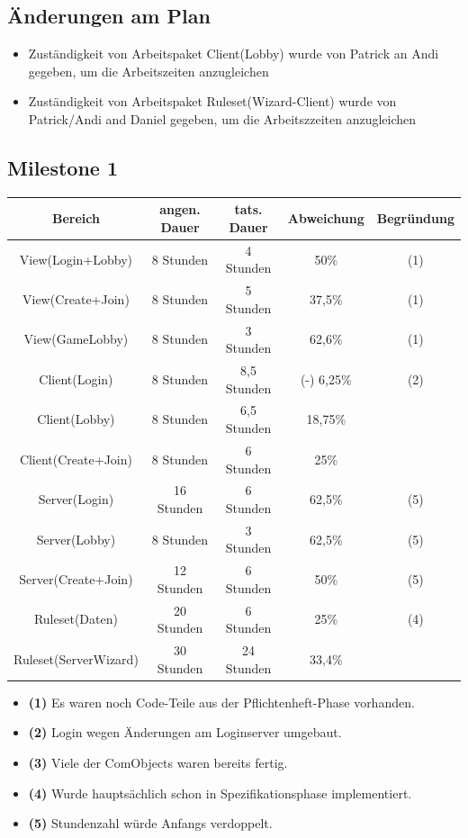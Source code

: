 \documentclass{article}
\begin{document}
\subsection{Änderungen am Plan}
\begin{itemize}
\item Zuständigkeit von Arbeitspaket Client(Lobby) wurde von Patrick an Andi gegeben, um die Arbeitszeiten anzugleichen
\item Zuständigkeit von Arbeitspaket Ruleset(Wizard-Client) wurde von Patrick/Andi and Daniel gegeben, um die Arbeitszzeiten anzugleichen
\end{itemize}

\subsection{Milestone 1}

\begin{tabular}{|c|c|c|c|c|}\hline
   Bereich & angen. Dauer & tats. Dauer & Abweichung & Begründung \\ \hline\hline
   View(Login+Lobby) & 8 Stunden & 4 Stunden & 50\% & (1) \\ \hline
   View(Create+Join) & 8 Stunden & 5 Stunden & 37,5\% & (1)\\ \hline
   View(GameLobby) & 8 Stunden & 3 Stunden & 62,6\% & (1)\\ \hline
   Client(Login) & 8 Stunden & 8,5 Stunden & (-) 6,25\% & (2) \\ \hline
   Client(Lobby) & 8 Stunden &  6,5 Stunden & 18,75\% &\\ \hline
   Client(Create+Join) &  8 Stunden & 6 Stunden & 25\% &\\ \hline
   Server(Login) & 16 Stunden & 6 Stunden & 62,5\% & (5) \\ \hline
   Server(Lobby) & 8 Stunden & 3 Stunden & 62,5\% & (5)\\ \hline 
   Server(Create+Join) & 12 Stunden & 6 Stunden & 50\% & (5)\\ \hline 
   Ruleset(Daten) & 20 Stunden & 6 Stunden & 25\% & (4) \\ \hline 
   Ruleset(ServerWizard) & 30 Stunden & 24 Stunden & 33,4\% &\\ \hline 
 \end{tabular}

\begin{itemize}
	\item \textbf{(1)} Es waren noch Code-Teile aus der Pflichtenheft-Phase vorhanden. \\
	\item \textbf{(2)} Login wegen Änderungen am Loginserver umgebaut. \\
	\item \textbf{(3)} Viele der ComObjects waren bereits fertig. \\
	\item \textbf{(4)} Wurde hauptsächlich schon in Spezifikationsphase implementiert. \\
	\item \textbf{(5)} Stundenzahl würde Anfangs verdoppelt. \\
\end{itemize}
\end{document}
